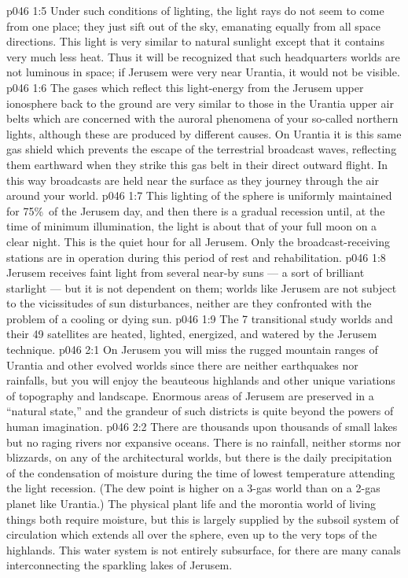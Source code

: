 \vs p046 1:5 Under such conditions of lighting, the light rays do not seem to come from one place; they just sift out of the sky, emanating equally from all space directions. This light is very similar to natural sunlight except that it contains very much less heat. Thus it will be recognized that such headquarters worlds are not luminous in space; if Jerusem were very near Urantia, it would not be visible.
\vs p046 1:6 The gases which reflect this light\hyp{}energy from the Jerusem upper ionosphere back to the ground are very similar to those in the Urantia upper air belts which are concerned with the auroral phenomena of your so\hyp{}called northern lights, although these are produced by different causes. On Urantia it is this same gas shield which prevents the escape of the terrestrial broadcast waves, reflecting them earthward when they strike this gas belt in their direct outward flight. In this way broadcasts are held near the surface as they journey through the air around your world.
\vs p046 1:7 This lighting of the sphere is uniformly maintained for 75\%\ of the Jerusem day, and then there is a gradual recession until, at the time of minimum illumination, the light is about that of your full moon on a clear night. This is the quiet hour for all Jerusem. Only the broadcast\hyp{}receiving stations are in operation during this period of rest and rehabilitation.
\vs p046 1:8 \pc Jerusem receives faint light from several near\hyp{}by suns --- a sort of brilliant starlight --- but it is not dependent on them; worlds like Jerusem are not subject to the vicissitudes of sun disturbances, neither are they confronted with the problem of a cooling or dying sun.
\vs p046 1:9 The 7 transitional study worlds and their 49 satellites are heated, lighted, energized, and watered by the Jerusem technique.
\vs p046 2:1 On Jerusem you will miss the rugged mountain ranges of Urantia and other evolved worlds since there are neither earthquakes nor rainfalls, but you will enjoy the beauteous highlands and other unique variations of topography and landscape. Enormous areas of Jerusem are preserved in a “natural state,” and the grandeur of such districts is quite beyond the powers of human imagination.
\vs p046 2:2 There are thousands upon thousands of small lakes but no raging rivers nor expansive oceans. There is no rainfall, neither storms nor blizzards, on any of the architectural worlds, but there is the daily precipitation of the condensation of moisture during the time of lowest temperature attending the light recession. (The dew point is higher on a 3\hyp{}gas world than on a 2\hyp{}gas planet like Urantia.) The physical plant life and the morontia world of living things both require moisture, but this is largely supplied by the subsoil system of circulation which extends all over the sphere, even up to the very tops of the highlands. This water system is not entirely subsurface, for there are many canals interconnecting the sparkling lakes of Jerusem.
